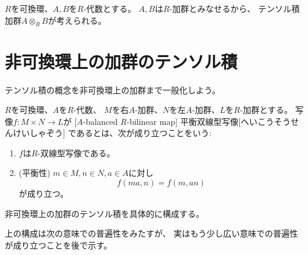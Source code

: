 \documentclass[report]{jlreq}
\begin{document}
\begin{corollary}[テンソル積の可換性]
    \TODO{}
\end{corollary}

\begin{corollary}[テンソル積の結合性]
    \TODO{}
\end{corollary}

\begin{definition}[代数のテンソル積]
    $R$を可換環、$A, B$を$R$-代数とする。
    $A, B$は$R$-加群とみなせるから、
    テンソル積加群$A \otimes_R B$が考えられる。

\end{definition}

%
\section{非可換環上の加群のテンソル積}

テンソル積の概念を非可換環上の加群まで一般化しよう。

\begin{definition}[$A$-平衡$R$-双線型写像]
    $R$を可換環、$A$を$R$-代数、
    $M$を右$A$-加群、$N$を左$A$-加群、$L$を$R$-加群とする。
    写像$f \colon M \times N \to L$が
    [$A$-balanced $R$-bilinear map]
    {平衡双線型写像}[へいこうそうせんけいしゃぞう]
    であるとは、次が成り立つことをいう:
    \begin{enumerate}
        \item $f$は$R$-双線型写像である。
        \item (平衡性) $m \in M, n \in N, a \in A$に対し
            \begin{equation}
                f(ma, n) = f(m, an)
            \end{equation}
            が成り立つ。
    \end{enumerate}
\end{definition}

非可換環上の加群のテンソル積を具体的に構成する。

\begin{definition}[非可換環上の加群のテンソル積の構成]
    \TODO{}
\end{definition}

上の構成は次の意味での普遍性をみたすが、
実はもう少し広い意味での普遍性が成り立つことを後で示す。
\end{document}

